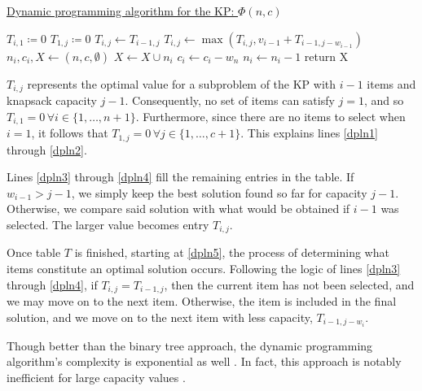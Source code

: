\begin{algorithm}
    \caption{\href{https://github.com/phcentenaro7/IC-Knapsack/blob/main/Knapsack/USP/dynamic_knapsack.jl}{Dynamic programming algorithm for the KP: $\Phi(n, c)$}}
    \label{alg:kp dynamic programming}
    \begin{algorithmic}[1]
         \label{dpln1}
            \State $T_{i,1} \coloneqq 0$
        \EndFor
            \State $T_{1,j} \coloneqq 0$ \label{dpln2}
             \label{dpln3}
                \State $T_{i,j} \gets T_{i-1,j}$
                    \State $T_{i,j} \gets \max{(T_{i,j}, v_{i-1} + T_{i-1,j-w_{i-1}})}$\label{dpln4}
                \EndIf
            \EndFor
        \EndFor
        \State $n_i, c_i, X \gets (n, c, \emptyset)$
         \label{dpln5}
                \State $X \gets X \cup n_i$
                \State $c_i \gets c_i - w_n$
            \EndIf
            \State $n_i \gets n_i - 1$
        \EndWhile
        \State return X
    \end{algorithmic}
\end{algorithm}

$T_{i,j}$ represents the optimal value for a subproblem of the KP with $i - 1$ items and knapsack capacity $j - 1$. Consequently, no set of items can satisfy $j = 1$, and so $T_{i,1} = 0 \, \forall i \in \{1,\dots,n + 1\}$. Furthermore, since there are no items to select when $i = 1$, it follows that $T_{1,j} = 0 \, \forall j \in \{1,\dots,c + 1\}$. This explains lines \ref{dpln1} through \ref{dpln2}.

Lines \ref{dpln3} through \ref{dpln4} fill the remaining entries in the table. If $w_{i-1} > j - 1$, we simply keep the best solution found so far for capacity $j - 1$. Otherwise, we compare said solution with what would be obtained if $i - 1$ was selected. The larger value becomes entry $T_{i,j}$.

Once table $T$ is finished, starting at \cref{dpln5}, the process of determining what items constitute an optimal solution occurs. Following the logic of lines \ref{dpln3} through \ref{dpln4}, if $T_{i,j} = T_{i-1,j}$, then the current item has not been selected, and we may move on to the next item. Otherwise, the item is included in the final solution, and we move on to the next item with less capacity, $T_{i-1,j-w_i}$.

Though better than the binary tree approach, the dynamic programming algorithm's complexity is exponential as well \cite{FEOFILOFF2020a}. In fact, this approach is notably inefficient for large capacity values \cite{HRISTAKEVA2005}.

